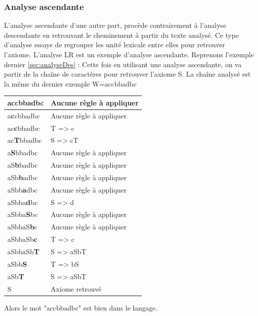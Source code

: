 \documentclass{article}
\begin{document}
\subsubsection{Analyse ascendante}
L’analyse ascendante d’une autre part, procède contrairement à l’analyse descendante en retrouvant le cheminement à partir du texte analysé. Ce type d’analyse essaye de regrouper les unité lexicale entre elles pour retrouver l’axiome. L’analyse LR est un exemple d’analyse ascendante.
Reprenons l'exemple dernier \ref{sec:analyseDes} :
Cette fois en utilisant une analyse ascendante, on va partir de la chaîne de caractères pour retrouver l'axiome S.
La chaîne analysé est la même du dernier exemple \newline W=accbbadbc\newline\newline\newline
\begin{tabular}{|l|l|}
\hline
\textbf{a}ccbbadbc & Aucune règle à appliquer\\
\hline
a\textbf{c}cbbadbc & Aucune règle à appliquer\\
\hline
ac\textbf{c}bbadbc & T => c\\
\hline
ac\textbf{T}bbadbc & S => cT\\
\hline
a\textbf{S}bbadbc & Aucune règle à appliquer\\
\hline
aS\textbf{b}badbc & Aucune règle à appliquer\\
\hline
aSb\textbf{b}adbc & Aucune règle à appliquer\\
\hline
aSbb\textbf{a}dbc & Aucune règle à appliquer\\
\hline
aSbba\textbf{d}bc & S => d\\
\hline
aSbba\textbf{S}bc & Aucune règle à appliquer\\
\hline
aSbbaS\textbf{b}c & Aucune règle à appliquer\\
\hline
aSbbaSb\textbf{c} & T => c\\
\hline
aSbbaSb\textbf{T} & S => aSbT\\
\hline
aSbb\textbf{S} & T => bS\\
\hline
aSb\textbf{T} & S => aSbT\\
\hline
S & Axiome retrouvé\\
\hline
\end{tabular}
\newline\newline\newline
Alors le mot "accbbadbc" est bien dans le langage.
\end{document}
